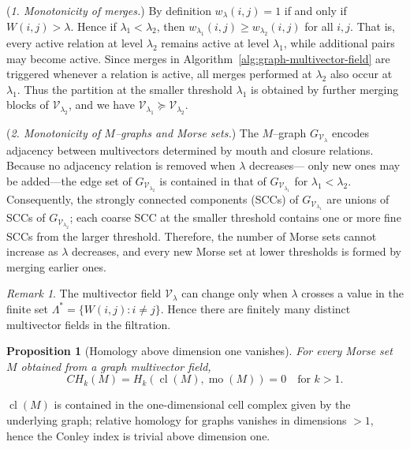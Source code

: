 \documentclass{article}
\theoremstyle{definition}
\theoremstyle{plain}
\newtheorem{proposition}{Proposition}
\theoremstyle{remark}
\newtheorem{remark}{Remark}
\newcommand{\1}{\mathbbm{1}}  %
\renewenvironment{proof}{{\bf Proof:\ }}{\qedsymbol}%
\begin{document}
\begin{proof}
(\emph{1. Monotonicity of merges.})  
By definition \(w_\lambda(i,j)=1\) if and only if \(W(i,j)>\lambda\).
Hence if \(\lambda_1<\lambda_2\), then
\(w_{\lambda_1}(i,j)\ge w_{\lambda_2}(i,j)\) for all \(i,j\).
That is, every active relation at level \(\lambda_2\) remains active at
level \(\lambda_1\), while additional pairs may become active.
Since merges in Algorithm~\ref{alg:graph-multivector-field} are triggered
whenever a relation is active, all merges performed at \(\lambda_2\)
also occur at \(\lambda_1\).
Thus the partition at the smaller threshold \(\lambda_1\) is obtained
by further merging blocks of \(\mathcal V_{\lambda_2}\), and we have
\(\mathcal V_{\lambda_1} \succeq \mathcal V_{\lambda_2}\).

(\emph{2. Monotonicity of $M$--graphs and Morse sets.})  
The $M$--graph \(G_{\mathcal V_\lambda}\) encodes adjacency between
multivectors determined by mouth and closure relations.
Because no adjacency relation is removed when $\lambda$ decreases—
only new ones may be added—the edge set of
\(G_{\mathcal V_{\lambda_2}}\) is contained in that of
\(G_{\mathcal V_{\lambda_1}}\) for \(\lambda_1<\lambda_2\).
Consequently, the strongly connected components (SCCs) of
\(G_{\mathcal V_{\lambda_1}}\) are unions of SCCs of
\(G_{\mathcal V_{\lambda_2}}\); each coarse SCC at the smaller threshold
contains one or more fine SCCs from the larger threshold.
Therefore, the number of Morse sets cannot increase as \(\lambda\)
decreases, and every new Morse set at lower thresholds is formed by
merging earlier ones.
\end{proof}

\begin{remark}
\label{prop:critical-lc}
The multivector field \(\mathcal V_\lambda\)  
can change only when \(\lambda\) crosses a value in the finite set
\(\Lambda^*=\{W(i,j):i\ne j\}\). Hence there are finitely many distinct multivector fields in the filtration.
\end{remark}
 

  

\begin{proposition}[Homology above dimension one vanishes]
\label{prop:homology-lc}
For every Morse set \(M\) obtained from a graph multivector field,
\[
CH_k(M)=H_k(\operatorname{cl}(M),\operatorname{mo}(M))=0\quad\text{for }k>1.
\]
\end{proposition}

\begin{proof}
\(\operatorname{cl}(M)\) is contained in the one-dimensional cell complex
given by the underlying graph; relative homology for graphs vanishes in
dimensions \(>1\), hence the Conley index is trivial above dimension one.
\end{proof}
\end{document}
